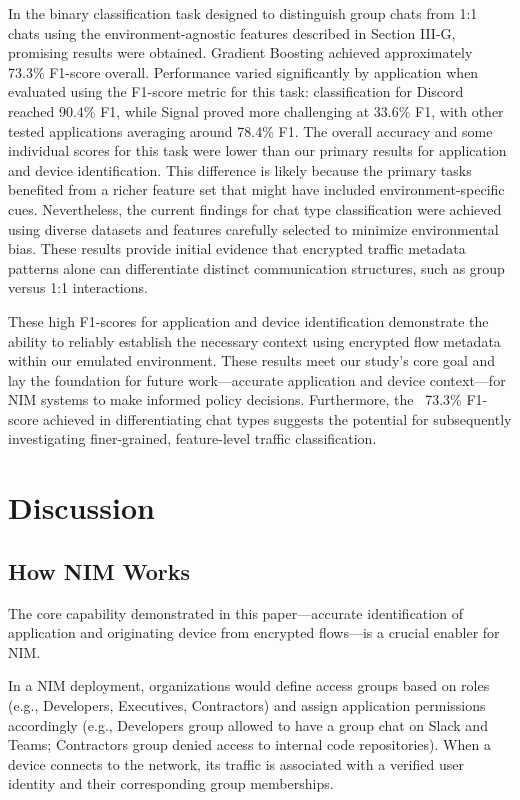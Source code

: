 \documentclass[conference]{IEEEtran}
\begin{document}
In the binary classification task designed to distinguish group chats from 1:1 chats using the environment-agnostic features described in Section III-G, promising results were obtained. Gradient Boosting achieved approximately 73.3\% F1-score overall. Performance varied significantly by application when evaluated using the F1-score metric for this task: classification for Discord reached 90.4\% F1, while Signal proved more challenging at 33.6\% F1, with other tested applications averaging around 78.4\% F1. The overall accuracy and some individual scores for this task were lower than our primary results for application and device identification. This difference is likely because the primary tasks benefited from a richer feature set that might have included environment-specific cues. Nevertheless, the current findings for chat type classification were achieved using diverse datasets and features carefully selected to minimize environmental bias. These results provide initial evidence that encrypted traffic metadata patterns alone can differentiate distinct communication structures, such as group versus 1:1 interactions.

These high F1-scores for application and device identification demonstrate the ability to reliably establish the necessary context using encrypted flow metadata within our emulated environment. These results meet our study's core goal and lay the foundation for future work—accurate application and device context—for NIM systems to make informed policy decisions. Furthermore, the ~73.3\% F1-score achieved in differentiating chat types suggests the potential for subsequently investigating finer-grained, feature-level traffic classification.


\section{Discussion}
\subsection{How NIM Works}
The core capability demonstrated in this paper—accurate identification of application and originating device from encrypted flows—is a crucial enabler for NIM.

In a NIM deployment, organizations would define access groups based on roles (e.g., Developers, Executives, Contractors) and assign application permissions accordingly (e.g., Developers group allowed to have a group chat on Slack and Teams; Contractors group denied access to internal code repositories). When a device connects to the network, its traffic is associated with a verified user identity and their corresponding group memberships.
\end{document}
